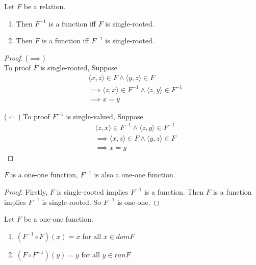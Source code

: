 \begin{theorem}{}{}
    Let $F$ be a relation.
    \begin{enumerate}

        \item Then $F^{-1}$ is a function iff $F$ is single-rooted.
        \item Then $F$ is a function iff $F^{-1}$ is single-rooted.

    \end{enumerate}
\end{theorem}

\begin{proof}
    ($\implies $)\\
    To proof $F$ is single-rooted, Suppose
    \begin{align*}
        &\langle x,z \rangle \in F \land \langle y,z \rangle \in F\\
        &\implies \langle z,x \rangle \in F^{-1} \land \langle z,y
        \rangle \in F^{-1} \\
        &\implies x = y
    \end{align*}

    ($\Leftarrow $)
    To proof $F^{-1}$ is single-valued, Suppose
    \begin{align*}
        &\langle z,x\rangle \in F^{-1} \land \langle z,y \rangle \in F^{-1}\\
        &\implies \langle x,z \rangle \in F \land \langle y,z \rangle \in F\\
        &\implies x = y
    \end{align*}
\end{proof}

\begin{corollary}{}{}
    $F$ is a one-one function, $F^{-1}$ is also a one-one function.
\end{corollary}

\begin{proof}
    Firstly, $F$ is single-rooted implies $F^{-1}$ is a function. Then
    $F$ is a function implies $F^{-1}$ is single-rooted. So $F^{-1}$ is one-one.
\end{proof}

\begin{theorem}{}{}
    Let $F$ be a one-one function.
    \begin{enumerate}

        \item $(F^{-1} \circ F)(x) = x$ for all $x \in domF$
        \item $(F \circ F^{-1})(y) = y$ for all $y \in ranF$

    \end{enumerate}
\end{theorem}

